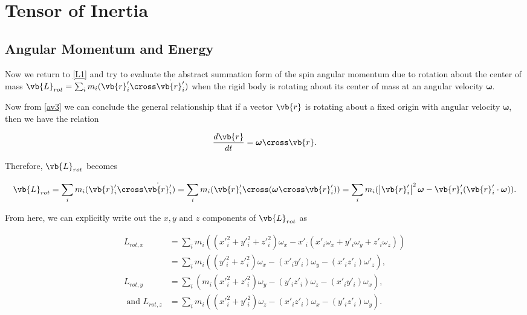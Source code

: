 \documentclass[a4paper,12pt]{report}
\begin{document}
\section{Tensor of Inertia}

\subsection{Angular Momentum and Energy}


Now we return to \cref{L1} and try to evaluate the abstract summation form of the spin angular momentum due to rotation about the center of mass \(\vb{L} _{rot} = \sum_{i}^{} m_{i} (\vb{r} '_{i} \cross \dot{\vb{r} '_{i} } )  \) when the rigid body is rotating about its center of mass at an angular velocity \(\boldsymbol{\omega } \).

Now from \cref{av3} we can conclude the general relationship that if a vector \(\vb{r} \)  is rotating about a fixed origin with angular velocity \(\boldsymbol{\omega } \), then we have the relation 

\begin{equation}
	\frac{d \vb{r}}{dt} =  \boldsymbol{\omega } \cross \vb{r} . \label{rotchange}  
\end{equation}

Therefore, \(\vb{L} _{rot} \)  becomes

\begin{equation}
	\vb{L} _{rot} = \sum_{i}^{} m_{i} (\vb{r} '_{i} \cross \dot{\vb{r} '_{i} } ) = \sum_{i}^{} m_{i} (\vb{r} '_{i} \cross (\boldsymbol{\omega } \cross \vb{r} '_{i}) ) = \sum_{i}^{} m_{i} (\left| \vb{r} '_{i}  \right| ^2 \boldsymbol{\omega } - \vb{r} '_{i} (\vb{r} '_{i} \cdot \boldsymbol{\omega } )). 
\end{equation}

From here, we can explicitly write out the \(x,y \text{ and } z\) components of \(\vb{L} _{rot} \) as

\begin{equation}
	\begin{aligned}
		L_{rot,x} &= \sum_{i}^{} m_{i} ((x'^2_i + y'^2_i + z'^2_i)\omega  _{x} - x'_{i} (x'_{i} \omega _{x} + y'_{i} \omega _{y} + z'_{i} \omega _{z} )) \\ 
		      &= \sum_{i}^{} m_{i} ((y'^2_i + z'^2_i)\omega _{x} - (x'_{i} y'_{i} )\omega _{y} - (x'_{i} z'_{i}) \omega '_{z}) , \\ 
		L_{rot,y} &= \sum_{i}^{} (m_{i} (x'^2_i + z'^2_i)\omega _{y} - (y'_{i} z'_{i} )\omega _{z} - (x'_{i} y'_{i} )\omega _{x}), \\ 
		\text{ and }  L_{rot,z} &= \sum_{i}^{} m_{i} ((x'^2_i + y'^2_i) \omega _{z} - (x'_{i} z'_{i} )\omega _{x} - (y'_{i} z'_{i} )\omega _{y}) . 
	\end{aligned}
\end{equation}
\end{document}
